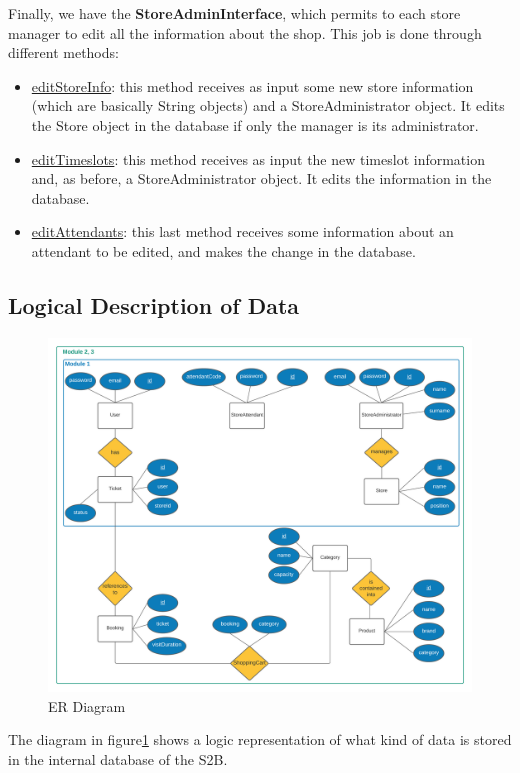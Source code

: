 \documentclass[table, 12pt]{article}
\begin{document}
Finally, we have the \textbf{StoreAdminInterface}, which permits to each store manager to edit all the information about the shop. This job is done through different methods:
\begin{itemize}
    \item \underline{editStoreInfo}: this method receives as input some new store information (which are basically String objects) and a StoreAdministrator object. It edits the Store object in the database if only the manager is its administrator.
    \item \underline{editTimeslots}: this method receives as input the new timeslot information and, as before, a StoreAdministrator object. It edits the information in the database.
    \item \underline{editAttendants}: this last method receives some information about an attendant to be edited, and makes the change in the database.
\end{itemize}

\subsection{Logical Description of Data}
\begin{figure}[H]
    \begin{center}
        \includegraphics[width=\textwidth]{assets/Architectural-Design/ER.png}
        \caption{ER Diagram}\label{er_diagram}
    \end{center}
\end{figure}
The diagram in figure\ref{er_diagram} shows a logic representation of what kind of data is stored in the internal database of the S2B.
\end{document}

